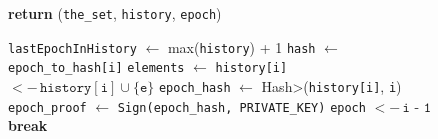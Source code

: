 \begin{figure}[t!]
\begin{adjustbox}{minipage=[t]{\columnwidth}}
\begin{algorithm}[H]
\begin{algorithmic}[1]
            \label{alg:hash_query}
            		\State {}
            		\State \textbf{return} (\texttt{the\_set}, \texttt{history}, \texttt{epoch})
            \EndFunction

				\State \texttt{lastEpochInHistory} $\leftarrow$ max(\texttt{history}) + 1
					\State \texttt{hash} $\leftarrow$  \texttt{epoch\_to\_hash[i]}\label{alg:hash-epoch-to-hash-use}
						\State \texttt{elements} $\leftarrow$ 
							 \label{line:abci-hashchain-history-if}
								\State  \texttt{history[i]} \(<- \, \texttt{history}[\texttt{i}] \cup \{\texttt{e}\}\) \label{line:abci-hashchain-history}
							\EndIf
						\EndFor
						\State \texttt{epoch\_hash} $\leftarrow$ \<Hash>(\texttt{history[i]}, \texttt{i})
						\State \texttt{epoch\_proof} $\leftarrow$  \texttt{Sign(\texttt{epoch\_hash}, PRIVATE\_KEY)}
					\State {}
					\Else
					\State \texttt{epoch} \(<- \, \texttt{i - 1}\)
						\State \textbf{break}
					\EndIf
				\EndFor
			\EndFunction

        \end{algorithmic}
      \end{algorithm}
	\end{adjustbox}
  \end{figure}
  

